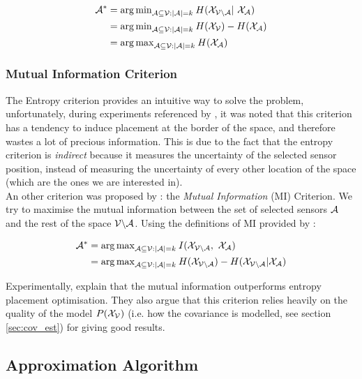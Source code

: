 \begin{align}
    \A^* &= {\arg\min}_{\A \subseteq \V : |\A| = k } \: H(\X_{\VA} | \X_\A) \\
     &= {\arg\min}_{\A \subseteq \V : |\A| = k }\:  H(\X_\V) -  H(\X_{\A}) \\
     &= {\arg\max}_{\A \subseteq \V : |\A| = k }\:  H(\X_{\A}) 
\end{align}


\subsubsection{Mutual Information Criterion}

The Entropy criterion provides an intuitive way to solve the problem, unfortunately, during experiments referenced by \citet{krause_near-optimal_2008}, it was noted that this criterion has a tendency to induce placement at the border of the space, and therefore wastes a lot of precious information. This is due to the fact that the entropy criterion is \textit{indirect} because it measures the uncertainty of the selected sensor position, instead of measuring the uncertainty of every other location of the space (which are the ones we are interested in). \\

An other criterion was proposed by \citet{caselton_optimal_1984} : the \textit{Mutual Information} (MI) Criterion. We try to maximise the mutual information between the set of selected sensors $\mathcal{A}$ and the rest of the space $\mathcal{V} \backslash\mathcal{A}$. Using the definitions of MI provided by \citet[p.~19]{cover_elements_1991} : 

\begin{align}
    \A^* &= {\arg\max}_{\A \subseteq \V : |\A| = k } \: I(\X_{\VA} , \X_\A) \\
    &= {\arg\max}_{\A \subseteq \V : |\A| = k } \: H(\X_{\VA}) -  H(\X_{\VA} | \X_{\A})
\end{align}


Experimentally, \citet{krause_near-optimal_2008} explain that  the mutual information outperforms entropy placement optimisation. They also argue that this criterion relies heavily on the quality of the model $P(\mathcal{X}_{\mathcal{V}})$ (i.e. how the covariance is modelled, see section \ref{sec:cov_est}) for giving good results. 

\subsection{Approximation Algorithm}
 
